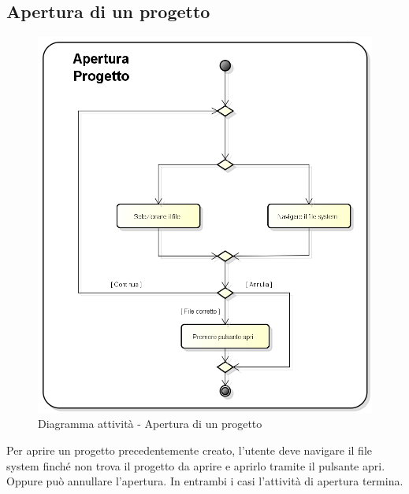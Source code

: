 \subsection{Apertura di un progetto}
\begin{figure}[h] 
	\centering 
	\includegraphics[scale=0.6] {img/activity_apertura.png}
	\caption{Diagramma attività - Apertura di un progetto} 
\end{figure}
Per aprire un progetto precedentemente creato, l'utente deve navigare il file system finché non trova il progetto da aprire e aprirlo tramite il pulsante apri. Oppure può annullare l'apertura. In entrambi i casi l'attività di apertura termina.
\newpage

